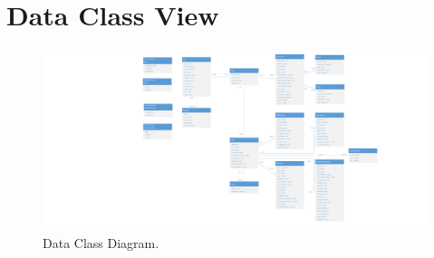 \section{Data Class View}

\begin{figure}
	\centering
	\includegraphics[width=0.8\linewidth]{./Iterazione 1/OtherFiles/UML - Data Class View}
	\caption{Data Class Diagram.}
	\label{fig:DataClassDiagram}
\end{figure}